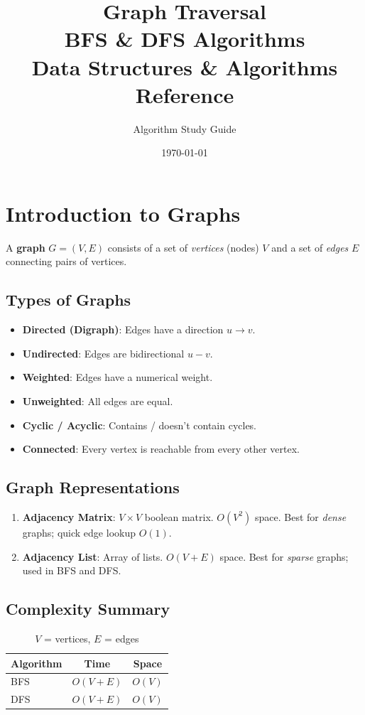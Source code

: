 \documentclass[12pt,a4paper]{article}
\title{
    \Huge \textbf{Graph Traversal} \\[0.5em]
    \Large BFS \& DFS Algorithms \\[0.5em]
    \large Data Structures \& Algorithms Reference
}
\author{Algorithm Study Guide}
\date{\today}
\begin{document}
\maketitle
\tableofcontents
\newpage

\section{Introduction to Graphs}

A \textbf{graph} $G = (V, E)$ consists of a set of \textit{vertices} (nodes) $V$ and a set of \textit{edges} $E$ connecting pairs of vertices.

\subsection{Types of Graphs}
\begin{itemize}
    \item \textbf{Directed (Digraph)}: Edges have a direction $u \to v$.
    \item \textbf{Undirected}: Edges are bidirectional $u - v$.
    \item \textbf{Weighted}: Edges have a numerical weight.
    \item \textbf{Unweighted}: All edges are equal.
    \item \textbf{Cyclic / Acyclic}: Contains / doesn't contain cycles.
    \item \textbf{Connected}: Every vertex is reachable from every other vertex.
\end{itemize}

\subsection{Graph Representations}
\begin{enumerate}
    \item \textbf{Adjacency Matrix}: $V \times V$ boolean matrix. $O(V^2)$ space.
          Best for \textit{dense} graphs; quick edge lookup $O(1)$.
    \item \textbf{Adjacency List}: Array of lists. $O(V + E)$ space.
          Best for \textit{sparse} graphs; used in BFS and DFS.
\end{enumerate}

\subsection{Complexity Summary}
\begin{table}[h!]
\centering
\begin{tabular}{|l|c|c|}
\hline
\textbf{Algorithm} & \textbf{Time} & \textbf{Space} \\
\hline
BFS & $O(V + E)$ & $O(V)$ \\
DFS & $O(V + E)$ & $O(V)$ \\
\hline
\end{tabular}
\caption{$V$ = vertices, $E$ = edges}
\end{table}
\end{document}
